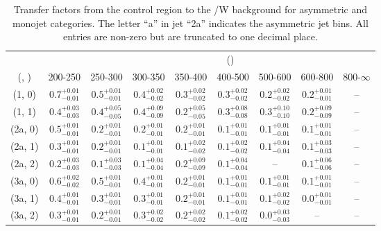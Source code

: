 \begin{table}[h!]
\tiny
\centering
\caption{Transfer factors from the \mj control region to the \ttbar/W background for asymmetric and monojet categories. The letter ``a'' in jet \eg ``2a''  indicates the asymmetric jet bins. All entries are non-zero but are truncated to one decimal place.\label{tab:tf_mu_ttw_asym}}
\begin{tabular}
{ccccccccc}
	\hline\hline
&	& \multicolumn{8}{c}{\scalht (\gev)} \\ 
	 (\njet,  \nb) & 200-250 & 250-300 & 300-350 & 350-400 & 400-500 & 500-600 & 600-800 & 800-$\infty$ \\ [0.8ex] 
\hline
	(1, 0) & $0.7^{+ 0.01 }_{- 0.01 }$ & $0.5^{+ 0.01 }_{- 0.01 }$ & $0.4^{+ 0.02 }_{- 0.02 }$ & $0.3^{+ 0.02 }_{- 0.02 }$ & $0.3^{+ 0.02 }_{- 0.02 }$ & $0.2^{+ 0.02 }_{- 0.02 }$ & $0.2^{+ 0.01 }_{- 0.01 }$ & -- \\[0.5ex] 
	(1, 1) & $0.4^{+ 0.03 }_{- 0.03 }$ & $0.4^{+ 0.05 }_{- 0.05 }$ & $0.4^{+ 0.09 }_{- 0.09 }$ & $0.2^{+ 0.05 }_{- 0.05 }$ & $0.3^{+ 0.08 }_{- 0.08 }$ & $0.3^{+ 0.10 }_{- 0.10 }$ & $0.2^{+ 0.09 }_{- 0.09 }$ & -- \\[0.5ex] 
	(2a, 0) & $0.5^{+ 0.01 }_{- 0.01 }$ & $0.2^{+ 0.01 }_{- 0.01 }$ & $0.2^{+ 0.01 }_{- 0.01 }$ & $0.2^{+ 0.01 }_{- 0.01 }$ & $0.1^{+ 0.01 }_{- 0.01 }$ & $0.1^{+ 0.01 }_{- 0.01 }$ & $0.1^{+ 0.01 }_{- 0.01 }$ & -- \\[0.5ex] 
	(2a, 1) & $0.3^{+ 0.01 }_{- 0.01 }$ & $0.2^{+ 0.01 }_{- 0.01 }$ & $0.1^{+ 0.01 }_{- 0.01 }$ & $0.1^{+ 0.02 }_{- 0.02 }$ & $0.1^{+ 0.02 }_{- 0.02 }$ & $0.1^{+ 0.04 }_{- 0.04 }$ & $0.1^{+ 0.03 }_{- 0.03 }$ & -- \\[0.5ex] 
	(2a, 2) & $0.2^{+ 0.03 }_{- 0.03 }$ & $0.1^{+ 0.03 }_{- 0.03 }$ & $0.1^{+ 0.04 }_{- 0.04 }$ & $0.2^{+ 0.09 }_{- 0.09 }$ & $0.1^{+ 0.04 }_{- 0.04 }$ & -- & $0.1^{+ 0.06 }_{- 0.06 }$ & -- \\[0.5ex] 
	(3a, 0) & $0.6^{+ 0.02 }_{- 0.02 }$ & $0.5^{+ 0.01 }_{- 0.01 }$ & $0.4^{+ 0.01 }_{- 0.01 }$ & $0.2^{+ 0.01 }_{- 0.01 }$ & $0.1^{+ 0.01 }_{- 0.01 }$ & $0.1^{+ 0.01 }_{- 0.01 }$ & $0.1^{+ 0.01 }_{- 0.01 }$ & -- \\[0.5ex] 
	(3a, 1) & $0.4^{+ 0.01 }_{- 0.01 }$ & $0.3^{+ 0.01 }_{- 0.01 }$ & $0.3^{+ 0.01 }_{- 0.01 }$ & $0.2^{+ 0.01 }_{- 0.01 }$ & $0.1^{+ 0.01 }_{- 0.01 }$ & $0.1^{+ 0.02 }_{- 0.02 }$ & $0.0^{+ 0.01 }_{- 0.01 }$ & -- \\[0.5ex] 
	(3a, 2) & $0.3^{+ 0.01 }_{- 0.01 }$ & $0.2^{+ 0.01 }_{- 0.01 }$ & $0.3^{+ 0.02 }_{- 0.02 }$ & $0.2^{+ 0.02 }_{- 0.02 }$ & $0.1^{+ 0.02 }_{- 0.02 }$ & $0.0^{+ 0.03 }_{- 0.03 }$ & -- & -- \\[0.5ex] 

\end{tabular}
\end{table}
